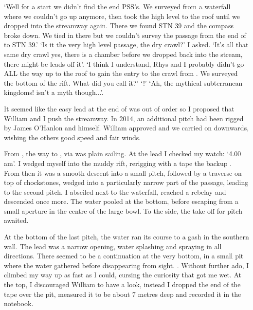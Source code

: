 `Well for a start we didn't find the end PSS's. We surveyed from a waterfall where we couldn't go up anymore, then took the high level to the roof until we dropped into the streamway again. There we found  STN 39 and the compass broke down. We tied in there but we couldn't survey the passage from the end of  to STN 39.'
`Is it the very high level passage, the dry crawl?' I asked.
`It's all that same dry crawl yes, there is a chamber before we dropped back into the stream, there might be leads off it'.
`I think I understand, Rhys and I probably didn't go ALL the way up to the roof to gain the entry to the crawl from . We surveyed the bottom of the rift. What did you call it?'
`!'
`Ah, the mythical subterranean kingdoms!  isn't a myth though...'.

\mydelimiter

It seemed like the easy lead at the end of  was out of order so I proposed that William and I push the  streamway. In 2014, an additional pitch had been rigged by James O'Hanlon and himself. William approved and we carried on downwards, wishing the others good speed and fair winds.

From , the way to , via  was plain sailing. At the lead I checked my watch: `4.00\,am'. I wedged myself into the muddy rift, rerigging with a tape the backup . From then it was a smooth descent into a small pitch, followed by a traverse on top of chockstones, wedged into a particularly narrow part of the passage, leading to the second pitch. I abseiled next to the waterfall, reached a rebelay and descended once more. The water pooled at the bottom, before escaping from a small aperture in the centre of the large bowl. To the side, the take off for  pitch awaited.

At the bottom of the last pitch, the water ran its course to a gash in the southern wall. The lead was a narrow opening, water splashing and spraying in all directions. There seemed to be a continuation at the very bottom, in a small pit where the water gathered before disappearing from sight. . Without further ado, I climbed my way up as fast as I could, cursing the curiosity that got me wet. At the top, I discouraged William to have a look, instead I dropped the end of the tape over the pit, measured it to be about 7 metres deep and recorded it in the notebook.

